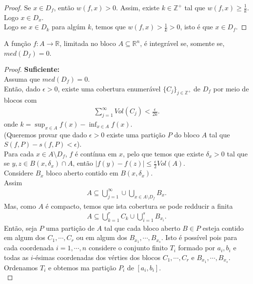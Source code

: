 \begin{proof} 
  Se $x\in D_f$, então $w(f,x)>0$. Assim, existe $k\in\mathbb{Z}^{+}$ tal que $w(f,x)\geq \frac{1}{k}$. Logo $x\in D_x$.\\
  Logo se $x\in D_k$ para algúm $k$, temos que $w(f,x)>\frac{1}{k}>0$, isto é que $x\in D_{f}$. 
\end{proof}
\begin{theorem}
  A função $f:A\to\mathbb{R}$, limitada no bloco $A\subseteq\mathbb{R}^{n}$, é integrável se, somente se, $med(D_f)=0$.
\end{theorem}
\begin{proof} 
\textbf{Suficiente:}\\
  Assuma que $med(D_f)=0$.\\
  Então, dado $\epsilon>0$, existe uma cobertura enumerável $\{C_j\}_{j\in\mathbb{Z}^{+}}$ de $D_f$ por meio de blocos com
  \begin{align*}
    \sum_{j=1}^{\infty}Vol(C_j)<\frac{\epsilon}{2k}.
  \end{align*}
  onde $k=\sup_{x\in A}f(x)-\inf_{x\in A}f(x)$.\\
  (Queremos provar que dado $\epsilon>0$ existe uma partição $P$ do bloco $A$ tal que $S(f,P)-s(f,P)<\epsilon$).\\
  Para cada $x\in A\setminus D_f$, $f$ é contínua em $x$, pelo que temos que existe $\delta_x>0$ tal que se $y,z\in B(x,\delta_x)\cap A$, então $|f(y)-f(z)|\leq \frac{\epsilon}{2}Vol(A)$.\\
  Considere $B_x$ bloco aberto contido em $B(x,\delta_x)$.\\
  Assim
  \begin{align*}
    A\subseteq \bigcup_{j=1}^{\infty}\cup\bigcup_{x\in A\setminus D_f}B_x.
  \end{align*}
  Mas, como $A$ é compacto, temos que ista cobertura se pode redducir a finita
  \begin{align*}
    A\subseteq \bigcup_{k=1}^{r}C_k\cup \bigcup_{i=1}^{s}B_{x_i}.
  \end{align*}
  Então, seja $P$ uma partição de $A$ tal que cada bloco aberto $B\in P$ esteja contido em algum dos $C_1,\cdots,C_r$ ou em algum dos $B_{x_1},\cdots,B_{x_{s}}$. Isto é  possível pois para cada coordenada $i=1,\cdots,n$ considere o conjunto finito $T_i$ formado por $a_i,b_i$ e todas as $i$-ésimas coordenadas dos vérties dos blocos $C_1,\cdots,C_r$ e $B_{x_1},\cdots,B_{x_{s}}$. Ordenamos $T_i$ e obtemos ma partição $P_i$ de $[a_i,b_i]$.\\

\end{proof}
